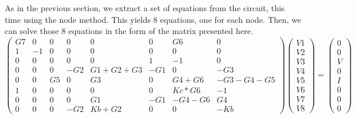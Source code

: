 As in the previous section, we extract a set of equations from the circuit, this time using the node method. This yields 8 equations, one for each node. Then, we can solve those 8 equations in the form of the matrix presented here.
\begin{equation}
\begin{pmatrix}
G7 & 0 & 0 & 0 & 0 & 0 & G6 & 0\\
1 & -1 & 0 & 0 & 0 & 0 & 0 & 0\\
0 & 0 & 0 & 0 & 0 & 1 & -1 & 0\\
0 & 0 & 0 & -G2 & G1+G2+G3 & -G1 & 0 & -G3\\
0 & 0 & G5 & 0 & G3 & 0 & G4+G6 & -G3-G4-G5\\
1 & 0 & 0 & 0 & 0 & 0& Kc*G6 & -1\\
0 & 0 & 0 & 0 & G1 & -G1 & -G4-G6 & G4\\
0 & 0 & 0 & -G2 & Kb+G2 & 0 & 0 & -Kb
\end{pmatrix}
\begin{pmatrix}
V1\\
V2\\
V3\\
V4\\
V5\\
V6\\
V7\\
V8
\end{pmatrix}
=
\begin{pmatrix}
0\\
0\\
V\\
0\\
I\\
0\\
0\\
0
\end{pmatrix}
\end{equation}

